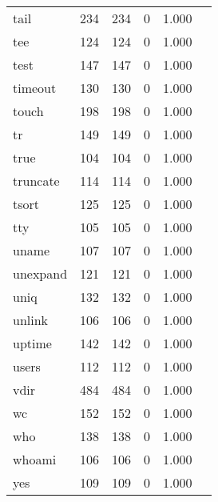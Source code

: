 \begin{longtable}{lp{2.40cm}p{2.40cm}p{2.40cm}p{2.40cm}p{2.40cm}}
tail      &                     234 &              234 &                 0 &                        1.000 \\
tee       &                     124 &              124 &                 0 &                        1.000 \\
test      &                     147 &              147 &                 0 &                        1.000 \\
timeout   &                     130 &              130 &                 0 &                        1.000 \\
touch     &                     198 &              198 &                 0 &                        1.000 \\
tr        &                     149 &              149 &                 0 &                        1.000 \\
true      &                     104 &              104 &                 0 &                        1.000 \\
truncate  &                     114 &              114 &                 0 &                        1.000 \\
tsort     &                     125 &              125 &                 0 &                        1.000 \\
tty       &                     105 &              105 &                 0 &                        1.000 \\
uname     &                     107 &              107 &                 0 &                        1.000 \\
unexpand  &                     121 &              121 &                 0 &                        1.000 \\
uniq      &                     132 &              132 &                 0 &                        1.000 \\
unlink    &                     106 &              106 &                 0 &                        1.000 \\
uptime    &                     142 &              142 &                 0 &                        1.000 \\
users     &                     112 &              112 &                 0 &                        1.000 \\
vdir      &                     484 &              484 &                 0 &                        1.000 \\
wc        &                     152 &              152 &                 0 &                        1.000 \\
who       &                     138 &              138 &                 0 &                        1.000 \\
whoami    &                     106 &              106 &                 0 &                        1.000 \\
yes       &                     109 &              109 &                 0 &                        1.000 \\
\end{longtable}

